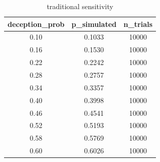 \begin{table}[h]
\centering
\begin{tabular}{|c|c|c|}
\hline
deception_prob & p_simulated & n_trials \\ \hline
0.10 & 0.1033 & 10000 \\
0.16 & 0.1530 & 10000 \\
0.22 & 0.2242 & 10000 \\
0.28 & 0.2757 & 10000 \\
0.34 & 0.3357 & 10000 \\
0.40 & 0.3998 & 10000 \\
0.46 & 0.4541 & 10000 \\
0.52 & 0.5193 & 10000 \\
0.58 & 0.5769 & 10000 \\
0.60 & 0.6026 & 10000 \\
\hline
\end{tabular}
\caption{traditional sensitivity}
\label{tab:T03}
\end{table}
